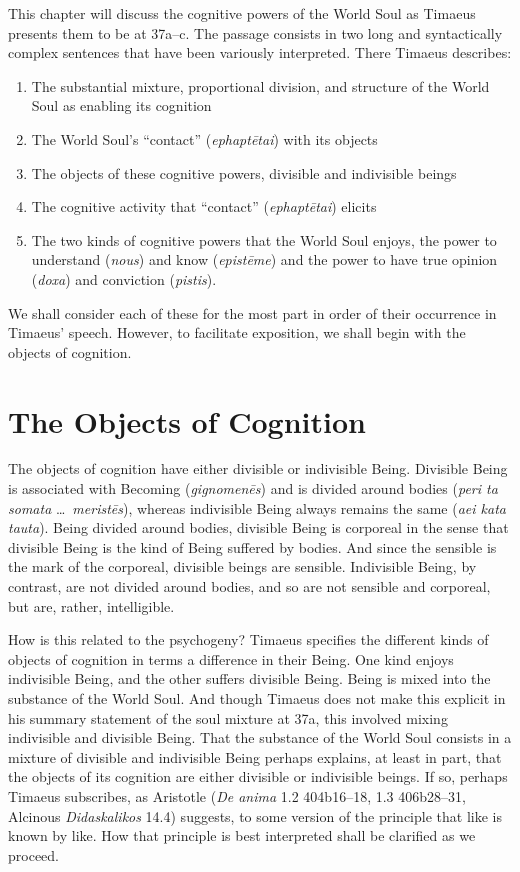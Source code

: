 This chapter will discuss the cognitive powers of the World Soul as Timaeus presents them to be at 37a--c. The passage consists in two long and syntactically complex sentences that have been variously interpreted. There Timaeus describes:
\begin{enumerate}[(1)]
	\item The substantial mixture, proportional division, and structure of the World Soul as enabling its cognition
	\item The World Soul's ``contact'' (\emph{ephaptētai}) with its objects
	\item The objects of these cognitive powers, divisible and indivisible beings
	\item The cognitive activity that ``contact'' (\emph{ephaptētai}) elicits
	\item The two kinds of cognitive powers that the World Soul enjoys, the power to understand (\emph{nous}) and know (\emph{epistēme}) and the power to have true opinion (\emph{doxa}) and conviction (\emph{pistis}).
\end{enumerate}
We shall consider each of these for the most part in order of their occurrence in Timaeus' speech. However, to facilitate exposition, we shall begin with the objects of cognition.


\section{The Objects of Cognition} %
\label{sec:the_objects_of_cognition}

The objects of cognition have either divisible or indivisible Being. Divisible Being is associated with Becoming (\emph{gignomenēs}) and is divided around bodies (\emph{peri ta somata} \ldots\ \emph{meristēs}), whereas indivisible Being always remains the same (\emph{aei kata tauta}). Being divided around bodies, divisible Being is corporeal in the sense that divisible Being is the kind of Being suffered by bodies. And since the sensible is the mark of the corporeal, divisible beings are sensible. Indivisible Being, by contrast, are not divided around bodies, and so are not sensible and corporeal, but are, rather, intelligible.

How is this related to the psychogeny? Timaeus specifies the different kinds of objects of cognition in terms a difference in their Being. One kind enjoys indivisible Being, and the other suffers divisible Being. Being is mixed into the substance of the World Soul. And though Timaeus does not make this explicit in his summary statement of the soul mixture at 37a, this involved mixing indivisible and divisible Being. That the substance of the World Soul consists in a mixture of divisible and indivisible Being perhaps explains, at least in part, that the objects of its cognition are either divisible or indivisible beings. If so, perhaps Timaeus subscribes, as Aristotle (\emph{De anima} 1.2 404b16--18, 1.3 406b28--31, Alcinous \emph{Didaskalikos} 14.4) suggests, to some version of the principle that like is known by like. How that principle is best interpreted shall be clarified as we proceed.

